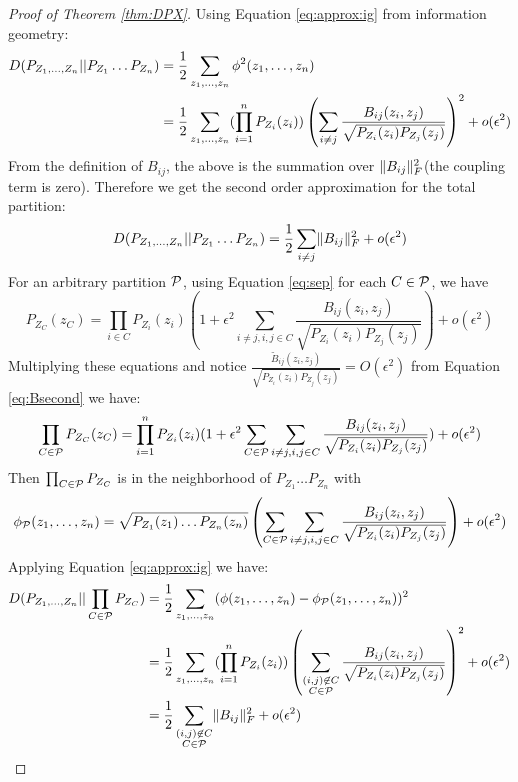 \begin{proof}[Proof of Theorem \ref{thm:DPX}]
Using Equation \eqref{eq:approx:ig} from information geometry:
\begin{align*}
D(P_{Z_1,\dots, Z_n}|| P_{Z_1}\dots P_{Z_n}) & ={1 \over 2} \sum_{z_1,\dots,z_n}\phi^2(z_1,\dots, z_n) \\
& = {1\over 2}\sum_{z_1,\dots,z_n} (\prod_{i=1}^n  P_{Z_i} (z_i)) \left(\sum_{i\neq j}{B_{ij}(z_i, z_j) \over \sqrt{P_{Z_i}(z_i)P_{Z_j}(z_j)} }\right)^2 +o(\epsilon^2) 
\end{align*}
From the definition of $B_{ij}$, the above is the summation over $\norm{B_{ij}}^2_F$(the coupling term is zero).
Therefore we get the second order approximation for the total partition:
\begin{equation}
D(P_{Z_1,\dots, Z_n}|| P_{Z_1}\dots P_{Z_n}) =   {1 \over 2} \sum_{i\neq j} \norm{B_{ij}}^2_F + o(\epsilon^2)
\end{equation}
For an arbitrary partition $\P$, using Equation \eqref{eq:sep} for each $C\in \P$, we have
\begin{equation}
P_{Z_C}(z_C) = \prod_{i\in C} P_{Z_i}(z_i)(1 + \epsilon^2 \sum_{i\neq j,i,j\in C} \frac{B_{ij}(z_i, z_j)}{\sqrt{P_{Z_i}(z_i)P_{Z_j}(z_j)}}) + o(\epsilon^2)
\end{equation}
Multiplying these equations and notice $\frac{\tilde{B}_{ij}(z_i, z_j)}{\sqrt{P_{Z_i}(z_i)P_{Z_j}(z_j)}}=O(\epsilon^2)$ from
Equation \eqref{eq:Bsecond} we have:
\begin{equation}
\prod_{C\in \P}P_{Z_C}(z_C) = \prod_{i=1}^n P_{Z_i}(z_i)(1+\epsilon^2 \sum_{C\in\P}\sum_{i\neq j,i,j\in C}\frac{B_{ij}(z_i, z_j)}{\sqrt{P_{Z_i}(z_i)P_{Z_j}(z_j)}}) + o(\epsilon^2)
\end{equation}
Then $\prod_{C\in \P}P_{Z_C}$ is in the neighborhood of $P_{Z_1}\dots P_{Z_n}$ with $$\phi_{\P}(z_1,\dots, z_n)=
\sqrt{P_{Z_1}(z_1)\dots P_{Z_n}(z_n)}\left(\sum_{C\in\P}\sum_{i\neq j,i,j\in C}\frac{B_{ij}(z_i, z_j)}{\sqrt{P_{Z_i}(z_i)P_{Z_j}(z_j)}}\right)+o(\epsilon^2)$$
Applying Equation  \eqref{eq:approx:ig} we have:
\begin{align*}
D(P_{Z_1,\dots, Z_n}|| \prod_{C\in \P}P_{Z_C}) & ={1 \over 2} \sum_{z_1,\dots,z_n}(\phi(z_1,\dots, z_n)-\phi_{\P}(z_1, \dots, z_n))^2 \\
& = {1\over 2}\sum_{z_1,\dots,z_n} (\prod_{i=1}^n  P_{Z_i} (z_i)) \left(\sum_{\substack{(i,j) \not\in C\\ C\in \P}} {B_{ij}(z_i, z_j) \over \sqrt{P_{Z_i}(z_i)P_{Z_j}(z_j)} }\right)^2 +o(\epsilon^2) \\
& = \frac{1}{2} \sum_{\substack{(i,j) \not\in C\\ C\in \P}} \norm{B_{ij}}_F^2 + o(\epsilon^2)
\end{align*}
\end{proof}
